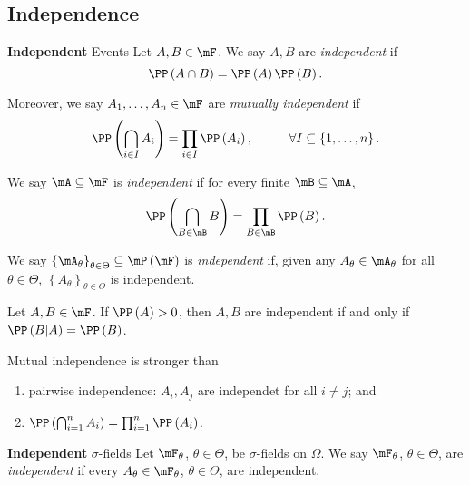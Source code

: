 \documentclass[stat901]{subfiles}
\begin{document}
    \subsection{Independence}
    
    \begin{definition}{\textbf{Independent} Events}
        Let $A,B\in\mF$. We say $A,B$ are \emph{independent} if
        \begin{equation*}
            \PP\left( A\cap B \right) = \PP\left( A \right)\PP\left( B \right).
        \end{equation*}

        Moreover, we say $A_1,\ldots,A_n\in\mF$ are \emph{mutually independent} if
        \begin{equation*}
            \PP\left( \bigcap^{}_{i\in I} A_i \right) = \prod^{}_{i\in I} \PP\left( A_i \right), \hspace{1cm}\forall I\subseteq\left\lbrace 1,\ldots,n \right\rbrace.
        \end{equation*}

        We say $\mA\subseteq\mF$ is \emph{independent} if for every finite $\mB\subseteq\mA$,
        \begin{equation*}
            \PP\left( \bigcap^{}_{B\in\mB} B \right) = \prod^{}_{B\in\mB}\PP\left( B \right).
        \end{equation*}

        We say $\left\lbrace \mA_{\theta} \right\rbrace^{}_{\theta\in\Theta}\subseteq\mP\left( \mF \right)$ is \emph{independent} if, given any $A_{\theta}\in\mA_{\theta}$ for all $\theta\in\Theta$, $\left\lbrace A_\theta \right\rbrace^{}_{\theta\in\Theta}$ is independent.
    \end{definition}

    \np Let $A,B\in\mF$. If $\PP\left( A \right) > 0$, then $A,B$ are independent if and only if $\PP\left( B|A \right) = \PP\left( B \right)$.

    \np Mutual independence is stronger than 
    \begin{enumerate}
        \item pairwise independence: $A_i, A_j$ are independet for all $i\neq j$; and
        \item $\PP\left( \bigcap^{n}_{i=1}A_i \right) = \prod^{n}_{i=1}\PP\left( A_i \right)$.
    \end{enumerate}

    \begin{definition}{\textbf{Independent} $\sigma$-fields}
        Let $\mF_{\theta}$, $\theta\in\Theta$, be $\sigma$-fields on $\Omega$. We say $\mF_{\theta}$, $\theta\in\Theta$, are \emph{independent} if every $A_{\theta}\in\mF_{\theta}$, $\theta\in\Theta$, are independent.
    \end{definition}
    
\end{document}
